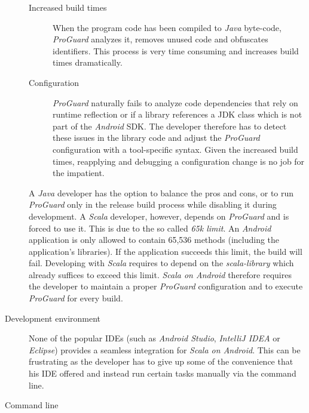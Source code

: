 \begin{description}
	\begin{description}

		\item[Increased build times]\hfill

		When the program code has been compiled to \textit{Java} byte-code, \textit{ProGuard} analyzes it, removes unused code and obfuscates identifiers. This process is very time consuming and increases build times dramatically.

		\item[Configuration]\hfill

		\textit{ProGuard} naturally fails to analyze code dependencies that rely on runtime reflection or if a library references a \ac{JDK} class which is not part of the \textit{Android} \ac{SDK}. The developer therefore has to detect these issues in the library code and adjust the \textit{ProGuard} configuration with a tool-specific syntax. Given the increased build times, reapplying and debugging a configuration change is no job for the impatient.

	\end{description}

	A \textit{Java} developer has the option to balance the pros and cons, or to run \textit{ProGuard} only in the release build process while disabling it during development. A \textit{Scala} developer, however, depends on \textit{ProGuard} and is forced to use it. This is due to the so called \textit{65k limit}. An \textit{Android} application is only allowed to contain 65,536 methods (including the application's libraries). If the application succeeds this limit, the build will fail. Developing with \textit{Scala} requires to depend on the \textit{scala-library} which already suffices to exceed this limit. \textit{Scala on Android} therefore requires the developer to maintain a proper \textit{ProGuard} configuration and to execute \textit{ProGuard} for every build.

	\item[Development environment]\hfill

	None of the popular \acp{IDE} (such as \textit{Android Studio}, \textit{IntelliJ IDEA} or \textit{Eclipse}) provides a seamless integration for \textit{Scala on Android}. This can be frustrating as the developer has to give up some of the convenience that his \ac{IDE} offered and instead run certain tasks manually via the command line.

	\item[Command line]\hfill


\end{description}
